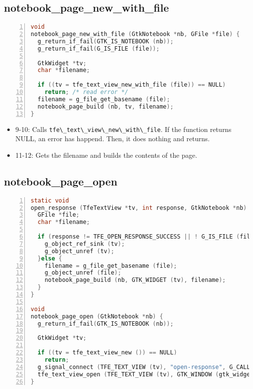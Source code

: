 \hypertarget{notebook_page_new_with_file}{%
\subsection{notebook\_page\_new\_with\_file}\label{notebook_page_new_with_file}}

\begin{lstlisting}[language=C, numbers=left]
void
notebook_page_new_with_file (GtkNotebook *nb, GFile *file) {
  g_return_if_fail(GTK_IS_NOTEBOOK (nb));
  g_return_if_fail(G_IS_FILE (file));

  GtkWidget *tv;
  char *filename;

  if ((tv = tfe_text_view_new_with_file (file)) == NULL)
    return; /* read error */
  filename = g_file_get_basename (file);
  notebook_page_build (nb, tv, filename);
}
\end{lstlisting}

\begin{itemize}
\tightlist
\item
  9-10: Calls
  \passthrough{\lstinline!tfe\_text\_view\_new\_with\_file!}. If the
  function returns NULL, an error has happend. Then, it does nothing and
  returns.
\item
  11-12: Gets the filename and builds the contents of the page.
\end{itemize}

\hypertarget{notebook_page_open}{%
\subsection{notebook\_page\_open}\label{notebook_page_open}}

\begin{lstlisting}[language=C, numbers=left]
static void
open_response (TfeTextView *tv, int response, GtkNotebook *nb) {
  GFile *file;
  char *filename;

  if (response != TFE_OPEN_RESPONSE_SUCCESS || ! G_IS_FILE (file = tfe_text_view_get_file (tv))) {
    g_object_ref_sink (tv);
    g_object_unref (tv);
  }else {
    filename = g_file_get_basename (file);
    g_object_unref (file);
    notebook_page_build (nb, GTK_WIDGET (tv), filename);
  }
}

void
notebook_page_open (GtkNotebook *nb) {
  g_return_if_fail(GTK_IS_NOTEBOOK (nb));

  GtkWidget *tv;

  if ((tv = tfe_text_view_new ()) == NULL)
    return;
  g_signal_connect (TFE_TEXT_VIEW (tv), "open-response", G_CALLBACK (open_response), nb);
  tfe_text_view_open (TFE_TEXT_VIEW (tv), GTK_WINDOW (gtk_widget_get_ancestor (GTK_WIDGET (nb), GTK_TYPE_WINDOW)));
}
\end{lstlisting}

